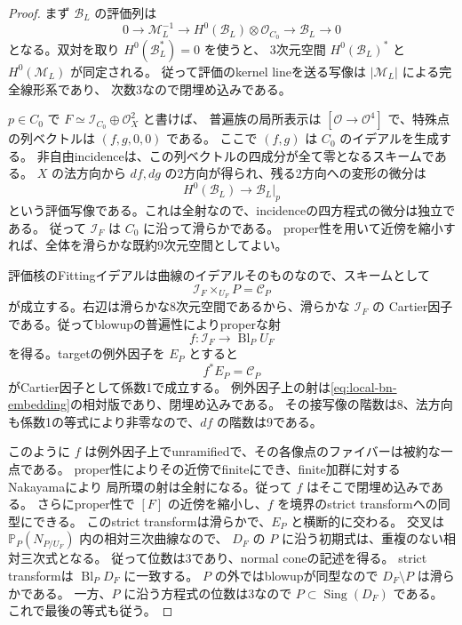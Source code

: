 \documentclass[a4paper,11pt]{ltjsarticle}
\newcommand{\mathscr}{\mathcal}
\theoremstyle{definition}
\newcommand{\OO}{\mathcal O}
\newcommand{\PP}{\mathbb P}
\begin{document}
\begin{proof}
まず $\mathcal B_L$ の評価列は
\begin{equation}\label{eq:local-bn-embedding}
 0\longrightarrow\mathcal M_L^{-1}
 \longrightarrow H^0(\mathcal B_L)\otimes\OO_{C_0}
 \longrightarrow\mathcal B_L\longrightarrow0
\end{equation}
となる。双対を取り $H^0(\mathcal B_L^*)=0$ を使うと、
3次元空間 $H^0(\mathcal B_L)^*$ と $H^0(\mathcal M_L)$ が同定される。
従って評価のkernel lineを送る写像は $|\mathcal M_L|$ による完全線形系であり、
次数3なので閉埋め込みである。

$p\in C_0$ で $F\simeq\mathcal I_{C_0}\oplus\OO_X^2$ と書けば、
普遍族の局所表示は $[\OO\to\OO^4]$ で、特殊点の列ベクトルは $(f,g,0,0)$ である。
ここで $(f,g)$ は $C_0$ のイデアルを生成する。
非自由incidenceは、この列ベクトルの四成分が全て零となるスキームである。
$X$ の法方向から $df,dg$ の2方向が得られ、残る2方向への変形の微分は
\[
 H^0(\mathcal B_L)\longrightarrow\mathcal B_L|_p
\]
という評価写像である。これは全射なので、incidenceの四方程式の微分は独立である。
従って $\mathcal I_F$ は $C_0$ に沿って滑らかである。
proper性を用いて近傍を縮小すれば、全体を滑らかな既約9次元空間としてよい。

評価核のFittingイデアルは曲線のイデアルそのものなので、スキームとして
\[
 \mathcal I_F\times_{U_F}P=\mathscr C_P
\]
が成立する。右辺は滑らかな8次元空間であるから、滑らかな $\mathcal I_F$ の
Cartier因子である。従ってblowupの普遍性によりproperな射
\[
 f:\mathcal I_F\longrightarrow\operatorname{Bl}_P U_F
\]
を得る。targetの例外因子を $E_P$ とすると
\[
 f^*E_P=\mathscr C_P
\]
がCartier因子として係数1で成立する。
例外因子上の射は\eqref{eq:local-bn-embedding}の相対版であり、閉埋め込みである。
その接写像の階数は8、法方向も係数1の等式により非零なので、$df$ の階数は9である。

このように $f$ は例外因子上でunramifiedで、その各像点のファイバーは被約な一点である。
proper性によりその近傍でfiniteにでき、finite加群に対するNakayamaにより
局所環の射は全射になる。従って $f$ はそこで閉埋め込みである。
さらにproper性で $[F]$ の近傍を縮小し、$f$ を境界のstrict transformへの同型にできる。
このstrict transformは滑らかで、$E_P$ と横断的に交わる。
交叉は $\PP_P(N_{P/U_F})$ 内の相対三次曲線なので、
$D_F$ の $P$ に沿う初期式は、重複のない相対三次式となる。
従って位数は3であり、normal coneの記述を得る。
strict transformは $\operatorname{Bl}_P D_F$ に一致する。
$P$ の外ではblowupが同型なので $D_F\setminus P$ は滑らかである。
一方、$P$ に沿う方程式の位数は3なので $P\subset\operatorname{Sing}(D_F)$ である。
これで最後の等式も従う。
\end{proof}
\end{document}
